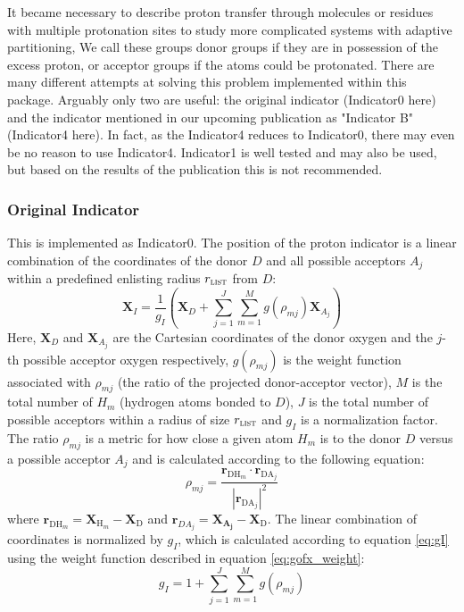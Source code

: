 \documentclass{article}
\newcommand{\mb}[1]{\mathbf{#1}}
\newcommand{\mr}[1]{\mathrm{#1}}
\begin{document}
It became necessary to describe proton transfer through molecules or residues with multiple protonation sites to study more complicated systems with adaptive partitioning, 
We call these groups donor groups if they are in possession of the excess proton, or acceptor groups if the atoms could be protonated. 
There are many different attempts at solving this problem implemented within this package.
Arguably only two are useful: the original indicator (Indicator0 here) and the indicator mentioned in our upcoming publication as "Indicator B" (Indicator4 here).
In fact, as the Indicator4 reduces to Indicator0, there may even be no reason to use Indicator4.
Indicator1 is well tested and may also be used, but based on the results of the publication this is not recommended.

\subsubsection{Original Indicator}\label{ss:original_indicator}
This is implemented as Indicator0.
The position of the proton  indicator is a linear combination of the coordinates of the donor $D$ and all possible acceptors $A_j$ within a predefined enlisting radius $r_\mathrm{\textsc{list}}$ from $D$:
\begin{equation}
\mathbf{X}_I = \frac{1}{g_I} \left( \mathbf{X}_D + \sum^{J}_{j=1} \sum^{M}_{m=1} g \left( \rho_{mj} \right) \mathbf{X}_{A_j} \right)
\end{equation}
Here, $\mathbf{X}_D$ and $\mathbf{X}_{A_{j}}$ are the Cartesian coordinates of the donor oxygen and the $j$-th possible acceptor oxygen respectively, $g ( \rho_{mj} )$ is the weight function associated with $\rho_{mj}$ (the ratio of the projected donor-acceptor vector), $M$ is the total number of $H_m$ (hydrogen atoms bonded to $D$), $J$ is the total number of possible acceptors within a radius of size $r_\mathrm{\textsc{list}}$ and $g_I$ is a normalization factor.
The ratio $\rho_{mj}$ is a metric for how close a given atom $H_m$ is to the donor $D$ versus a possible acceptor $A_j$ and is calculated according to the following equation:
\begin{equation}
\rho_{mj}=\frac{ \mathbf{r}_{\mathrm{DH}_m} \cdot \mathbf{r}_{\mathrm{DA}_j} } { | \mathbf{r}_{\mathrm{DA}_j} |^2 }
\end{equation}
where $\mathbf{r}_{\mathrm{DH}_m} = \mb{X}_{\mathrm{H}_m} - \mb{X}_\mr{D}$ and $\mb{r}_{DA_j} = \mb{X_{A_j}} - \mb{X}_\mr{D}$.
The linear combination of coordinates is normalized by $g_I$, which is calculated according to equation \ref{eq:gI} using the weight function described in equation \ref{eq:gofx_weight}:
\begin{equation}\label{eq:gI}
g_I = 1 + \sum^J_{j=1} \sum^M_{m=1} g ( \rho_{mj} )
\end{equation}
\end{document}
